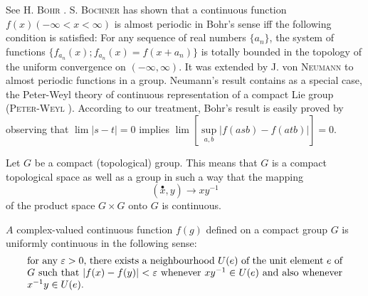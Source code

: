See H. \textsc{Bohr} \cite{bohr25}. S. \textsc{Bochner} \cite{bochner23} has shown that a continuous function $f(x) (-\infty < x < \infty)$ is almost periodic in Bohr's sense iff the following condition is satisfied: For any sequence of real numbers $\{a_n\}$, the system of functions $\{f_{a_{n}}(x); f_{a_{n}}(x) = f(x + a_n)\}$ is totally bounded in the topology of the uniform convergence on $(-\infty, \infty)$. It was extended by J. von \textsc{Neumann} \cite{neumann231} to almost periodic functions in a group. Neumann's result contains as a special case, the Peter-Weyl theory of continuous representation of a compact Lie group (\textsc{Peter}-\textsc{Weyl} \cite{peter247}). According to our treatment, Bohr's result is easily proved by observing that $\lim |s - t| = 0$ implies $\lim \left[\sup\limits_{a,b} |f(asb) - f(atb)|\right] = 0$. 


\label{sec:XI.11}

Let $G$ be a compact (topological) group. This means that $G$ is a compact topological space as well as a group in such a way that the mapping 
\[
(\stackrel {\bullet} {x}, y) \rightarrow x y ^{-1}
\]
of the product space $G \times G$ onto $G$ is continuous. 

\begin{proposition}\label{prop:XI.11.Proposition.1} $A$ complex-valued continuous function $f(g)$ defined on a compact group $G$ is uniformly continuous in the following sense: 
\begin{equation}\label{eq:XI.11.1}
\parbox{0.92\linewidth}{\everymath{}\let\limits\nolimits for any $\varepsilon > 0$, there exists a neighbourhood $U(e)$ of the unit element $e$ of $G$ such that $|f(x) - f(y)| < \varepsilon$ whenever $xy^{-1} \in U(e)$ and also whenever $x^{-1}y \in U(e)$.}
\end{equation}
\end{proposition}


